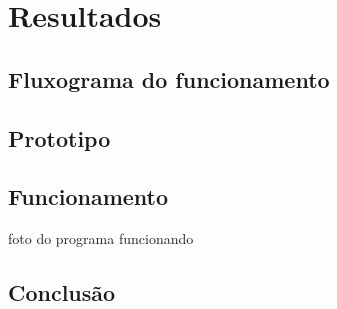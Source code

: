 \chapter{Resultados}\label{cap:conclusao}
\section{Fluxograma do funcionamento}
\section{Prototipo}
\section{Funcionamento}
foto do programa funcionando
\lipsum[5]
\section{Conclusão}

\lipsum[5] 